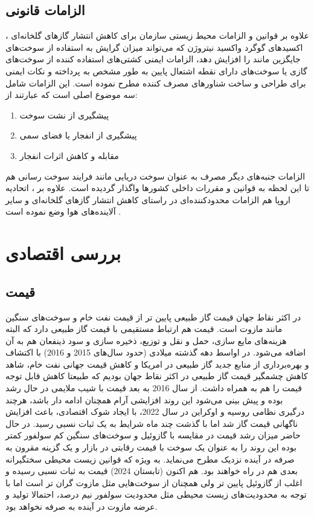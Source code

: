   \subsection{الزامات قانونی}
  علاوه بر قوانین و الزامات محیط زیستی سازمان  برای کاهش انتشار گازهای گلخانه‌ای ، اکسیدهای گوگرد  واکسید نیتروژن  که می‌تواند میزان گرایش به استفاده از سوخت‌های جایگزین مانند  را افزایش دهد، الزامات ایمنی کشتی‌های استفاده کننده از سوخت‌های گازی یا سوخت‌های دارای نقطه اشتعال پایین  به طور مشخص به  پرداخته و نکات ایمنی برای طراحی و ساخت شناورهای مصرف کننده  مطرح نموده است. این الزامات شامل سه موضوع اصلی است که عبارتند از:
  \begin{enumerate}
  	\item پیشگیری از نشت سوخت
  	\item پیشگیری از انفجار یا فضای سمی
  	\item مقابله و کاهش اثرات انفجار 
  \end{enumerate}
  الزامات جنبه‌های دیگر مصرف  به عنوان سوخت دریایی مانند فرایند سوخت رسانی  هم تا این لحظه به قوانین و مقررات داخلی کشورها واگذار گردیده است.  علاوه بر  ، اتحادیه اروپا هم الزامات محدودکننده‌ای در راستای کاهش انتشار گازهای گلخانه‌ای و سایر آلاینده‌های هوا وضع نموده است 
.
\section{بررسی اقتصادی }
\subsection{قیمت}
	در اکثر نقاط جهان قیمت گاز طبیعی پایین تر از قیمت نفت خام و سوخت‌های سنگین مانند مازوت است. قیمت  هم ارتباط مستقیمی با قیمت گاز طبیعی دارد که البته هزینه‌های مایع سازی، حمل و نقل و توزیع، ذخیره سازی و سود ذینفعان هم به آن اضافه ‌می‌شود.
در اواسط دهه گذشته میلادی (حدود سال‌های 2015 و 2016) با اکتشاف و بهره‌برداری از منابع جدید گاز طبیعی در امریکا و کاهش قیمت جهانی نفت خام، شاهد کاهش چشمگیر قیمت گاز طبیعی در اکثر نقاط جهان بودیم که طبیعتا کاهش قابل توجه قیمت  را هم به همراه داشت. از سال 2016 به بعد قیمت  با شیب ملایمی در حال رشد بوده و پیش بینی می‌شود این روند افزایشی آرام همچنان ادامه دار باشد، هرچند درگیری نظامی روسیه و اوکراین در سال 2022، با ایجاد شوک اقتصادی، باعث افزایش ناگهانی قیمت گاز شد اما با گذشت چند ماه شرایط به یک ثبات نسبی رسید.
در حال حاضر میزان رشد قیمت  در مقایسه با گازوئیل و سوخت‌های سنگین کم سولفور کمتر بوده این روند  را به عنوان یک سوخت با قیمت رقابتی در بازار و یک گزینه مقرون به صرفه در آینده نزدیک مطرح می‌نماید. به ویژه که قوانین زیست محیطی سختگیرانه بعدی هم در راه خواهند بود.
هم اکنون (تابستان 2024) قیمت  به ثبات نسبی رسیده و اغلب از گازوئیل پایین تر ولی همچنان از سوخت‌هایی مثل مازوت گران تر است اما با توجه به محدودیت‌های زیست محیطی مثل محدودیت سولفور نیم درصد، احتمالا تولید و عرضه مازوت در آینده به صرفه نخواهد بود. 

